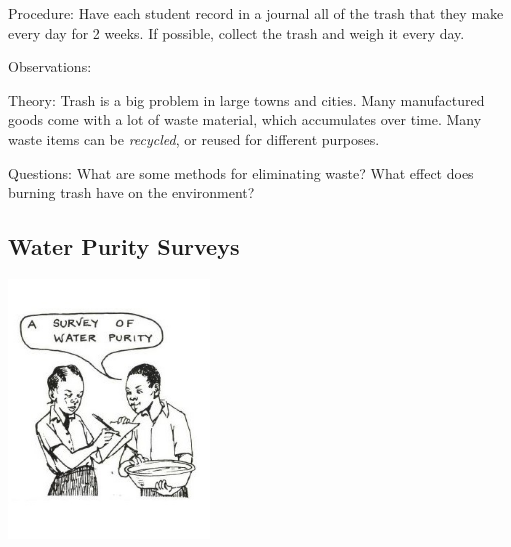 \begin{multicols}{2}
\begin{description*}
\item[Procedure:]{Have each student record in a journal all of the trash that they make every day for 2 weeks. If possible, collect the trash and weigh it every day.}
\item[Observations:]{}
\item[Theory:]{Trash is a big problem in large towns and cities. Many manufactured goods come with a lot of waste material, which accumulates over time. Many waste items can be \emph{recycled}, or reused for different purposes.}
\item[Questions:]{What are some methods for eliminating waste? What effect does burning trash have on the environment?}
\end{description*}

\vfill

\subsection{Water Purity Surveys} 

\begin{center}
\includegraphics[width=0.4\textwidth]{./img/source/water-purity.jpg}
\end{center}


\end{multicols}
